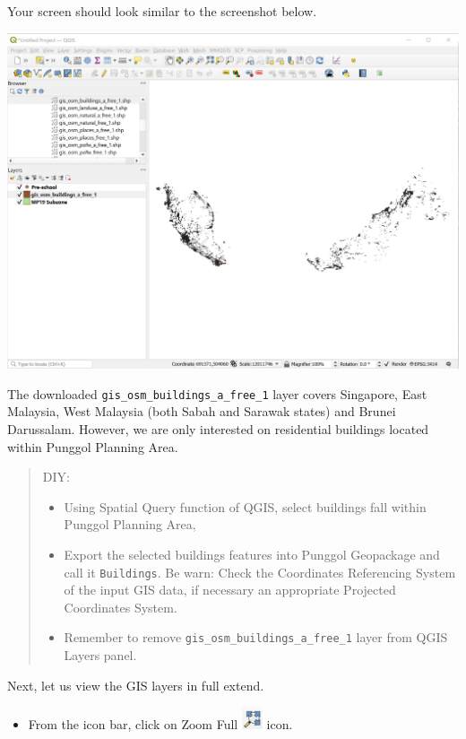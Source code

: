 \documentclass[
  letterpaper,
  DIV=11,
  numbers=noendperiod]{scrreprt}
\providecommand{\tightlist}{%
  \setlength{\itemsep}{0pt}\setlength{\parskip}{0pt}}\usepackage{longtable,booktabs,array}
\begin{document}
Your screen should look similar to the screenshot below.

\includegraphics{./img04/image98.jpg}

The downloaded \texttt{gis\_osm\_buildings\_a\_free\_1} layer covers
Singapore, East Malaysia, West Malaysia (both Sabah and Sarawak states)
and Brunei Darussalam. However, we are only interested on residential
buildings located within Punggol Planning Area.

\begin{quote}
DIY:

\begin{itemize}
\item
  Using Spatial Query function of QGIS, select buildings fall within
  Punggol Planning Area,
\item
  Export the selected buildings features into Punggol Geopackage and
  call it \texttt{Buildings}. Be warn: Check the Coordinates Referencing
  System of the input GIS data, if necessary an appropriate Projected
  Coordinates System.
\item
  Remember to remove \texttt{gis\_osm\_buildings\_a\_free\_1} layer from
  QGIS Layers panel.
\end{itemize}
\end{quote}

Next, let us view the GIS layers in full extend.

\begin{itemize}
\tightlist
\item
  From the icon bar, click on Zoom Full
  \includegraphics[width=0.23958in,height=\textheight]{./img04/image96.jpg}
  icon.
\end{itemize}
\end{document}
